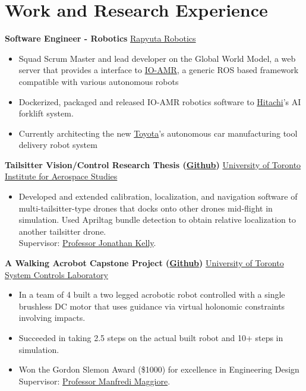 \documentclass[11pt, a4paper]{cv}
\begin{document}
\section*{Work and Research Experience}\noindent
	\textbf{Software Engineer - Robotics} \hfill 	\href{https://www.rapyuta-robotics.com}{Rapyuta Robotics}
	\begin{itemize}
	\item Squad Scrum Master and lead developer on the Global World Model, a web server that provides a interface to \href{https://www.rapyuta-robotics.com/amr-starter-package/}{IO-AMR}, a generic ROS based framework compatible with various autonomous robots
	\item Dockerized, packaged and released IO-AMR robotics software to \href{https://www.hitachi.com/}{Hitachi}'s AI forklift system.
	\item Currently architecting the new \href{https://global.toyota/en/}{Toyota}'s autonomous car manufacturing tool delivery robot system
	\end{itemize}

	\textbf{Tailsitter Vision/Control Research Thesis (\href{https://github.com/utiasSTARS/PhoenixDrone}{Github})} \hfill \href{http://www.starslab.ca}{University of Toronto Institute for Aerospace Studies}
	\begin{itemize}
	\item Developed and extended calibration, localization, and navigation software of multi-tailsitter-type drones that docks onto other drones mid-flight in simulation. Used Apriltag bundle detection to obtain relative localization to another tailsitter drone. \\Supervisor: \href{http://stars.utias.utoronto.ca/~jkelly/}{Professor Jonathan Kelly}.
	\end{itemize}

	\textbf{A Walking Acrobot  Capstone Project (\href{https://github.com/Vuwij/acrobot}{Github})} \hfill \href{https://www.control.utoronto.ca/}{University of Toronto System Controls Laboratory}
	\begin{itemize}
		\item In a team of 4 built a two legged acrobotic robot controlled with a single brushless DC motor that uses guidance via virtual holonomic constraints involving impacts.
		\item Succeeded in taking 2.5 steps on the actual built robot and 10+ steps in simulation.
		\item Won the Gordon Slemon Award (\$1000) for excellence in Engineering Design\\ Supervisor: \href{https://www.control.utoronto.ca/~maggiore/}{Professor Manfredi Maggiore}.
	\end{itemize}
\end{document}
